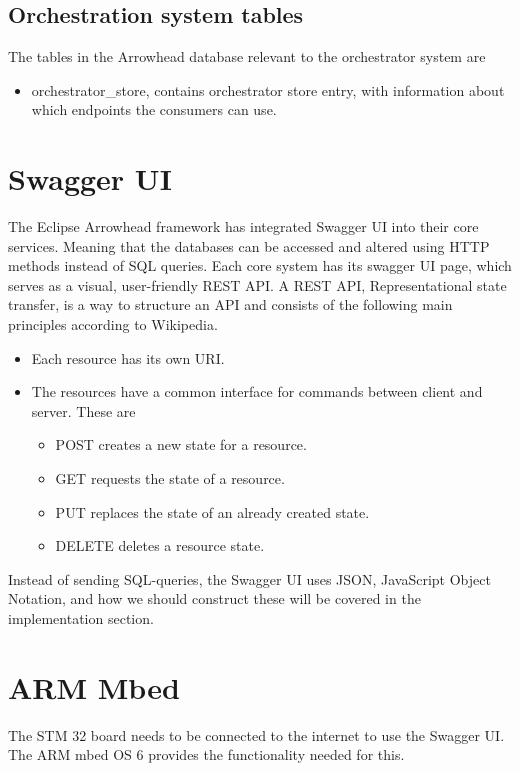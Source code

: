 \subsection{Orchestration system tables}
The tables in the Arrowhead database relevant to the orchestrator system are
\begin{itemize}
    \item orchestrator\_store,  contains orchestrator store entry, with information about which endpoints the consumers can use.
\end{itemize}

\section{Swagger UI}
The Eclipse Arrowhead framework has integrated Swagger UI into their core services. 
Meaning that the databases can be accessed and altered using HTTP methods instead of SQL queries.
Each core system has its swagger UI page, which serves as a visual, user-friendly REST API. 
A REST API, Representational state transfer, is a way to structure an API and consists of the following main principles according to Wikipedia.\cite{WIKIREST2021}
\begin{itemize}
    \item Each resource has its own URI.
    \item The resources have a common interface for commands between client and server. These are
    \begin{itemize}
        \item POST creates a new state for a resource.
        \item GET requests the state of a resource.
        \item PUT replaces the state of an already created state.
        \item DELETE deletes a resource state.
    \end{itemize}
\end{itemize}
Instead of sending SQL-queries, the Swagger UI uses JSON, JavaScript Object Notation, and how we should construct these will be covered in the implementation section.
\section{ARM Mbed}
The  STM 32 board needs to be connected to the internet to use the Swagger UI. 
The ARM mbed OS 6 provides the functionality needed for this. 

